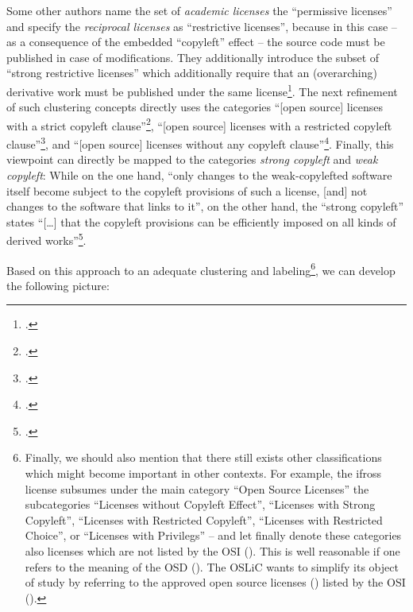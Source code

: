 Some other authors name the set of \emph{academic licenses} the
\enquote{permissive licenses} and specify the \emph{reciprocal licenses} as
\enquote{restrictive licenses}, because in this case -- as a consequence of the
embedded \enquote{copyleft} effect -- the source code must be published in case
of modifications. They additionally introduce the subset of \enquote{strong
restrictive licenses} which additionally require that an (overarching)
derivative work must be published under the same license\footcite[pars pro toto
cf.][57]{Buchtala2007a}. The next refinement of such clustering concepts
directly uses the categories \enquote{[open source] licenses with a strict
copyleft clause}\footcite[Originally stated as \enquote{Lizenzen mit einer
strengen Copyleft-Klausel}. Cf.][24]{JaeMet2011a}, \enquote{[open source]
licenses with a restricted copyleft clause}\footcite[Originally stated as
\enquote{Lizenzen mit einer beschränkten Copyleft-Klausel}.
Cf.][71]{JaeMet2011a}, and \enquote{[open source] licenses without any copyleft
clause}\footcite[Originally stated as \enquote{Lizenzen ohne Copyleft-Klausel}.
Cf.][83]{JaeMet2011a}. Finally, this viewpoint can directly be mapped to the
categories \emph{strong copyleft} and \emph{weak copyleft}: While on the one
hand, \enquote{only changes to the weak-copylefted software itself become
subject to the copyleft provisions of such a license, [and] not changes to the
software that links to it}, on the other hand, the \enquote{strong copyleft}
states \enquote{[\ldots] that the copyleft provisions can be efficiently imposed
on all kinds of derived works}\footcite[cf.][\nopage wp]{wpCopyleft2013a}.

Based on this approach to an adequate clustering and labeling\footnote{Finally,
we should also mention that there still exists other classifications which might
become important in other contexts. For example, the ifross license subsumes
under the main category \enquote{Open Source Licenses} the subcategories
\enquote{Licenses without Copyleft Effect}, \enquote{Licenses with Strong
Copyleft}, \enquote{Licenses with Restricted Copyleft}, \enquote{Licenses with
Restricted Choice}, or \enquote{Licenses with Privilegs} -- and let finally
denote these categories also licenses which are not listed by the OSI
(\cite[cf.][\nopage wp]{ifross2011a}). This is well reasonable if one refers to
the meaning of the OSD (\cite[cf.][\nopage wp]{OSI2012a}). The OSLiC wants to
simplify its object of study by referring to the approved open source licenses
(\cite[cf.][\nopage wp]{OSI2012d}) listed by the OSI (\cite[cf.][\nopage
wp]{OSI2012b}).}, we can develop the following picture:

